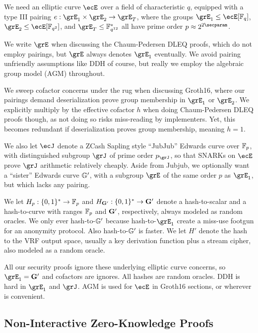 We need an elliptic curve $\ecE$ over a field of characteristic $q$,
equipped with a type III pairing $e : \grE_1 \times \grE_2 \to \grE_T$,
where the groups  $\grE_1 \le \ecE[\F_q]$, $\grE_2 \le \ecE[\F_{q^2}]$, and
$\grE_T \le \F^*_{q^{12}}$ all have prime order $p \approx 2^{2\secparam}$.

We write $\grE$ when discussing the Chaum-Pedersen DLEQ proofs, which do
not employ pairings, but $\grE$ always denotes $\grE_1$ eventually.
We avoid pairing unfriendly assumptions like DDH of course, but really
we employ the algebraic group model (AGM) throughout.

We sweep cofactor concerns under the rug when discussing Groth16,
where our pairings demand deserialization prove group membership in $\grE_1$
or $\grE_2$.  We explicitly multiply by the effective cofactor $h$ when
doing Chaum-Pedersen DLEQ proofs though, as not doing so risks miss-reading
by implementers.  Yet, this becomes redundant if deserialization proves
group membership, meaning $h=1$.

We also let $\ecJ$ denote a ZCash Sapling style ``JubJub'' Edwards curve
over $\mathbb{F}_p$, with distinguished subgroup $\grJ$ of prime order $p_\grJ$, so that
SNARKs on $\ecE$ prove $\grJ$ arithmetic relatively cheaply.
Aside from Jubjub, we optionally want a ``sister'' Edwards curve ${\mathbb{G}'}$,
with a subgroup $\grE$ of the same order $p$ as $\grE_1$,
 but which lacks any pairing.

We let $H_p : \{0,1\}^* \to \mathbb{F}_p$ and $H_{{\mathbf{G}'}} : \{0,1\}^* \to {\mathbf{G}'}$
denote a hash-to-scalar and a hash-to-curve  with ranges
$\mathbb{F}_p$ and ${\mathbf{G}'}$, respectively, always modeled as random oracles.  
We only ever hash-to-${\mathbb{G}'}$ because hash-to-$\grE_1$ create a miss-use
footgun for an anonymity protocol.  Also hash-to-${\mathbb{G}'}$ is faster.
We let $H'$ denote the hash to the VRF output space, usually
 a key derivation function plus a stream cipher, also modeled as a random oracle.

All our security proofs ignore these underlying elliptic curve concerns,
so $\grE_1 = \grEsis$ and cofactors are ignores.
All hashes are random oracles.  DDH is hard in $\grE_1$ and $\grJ$.
AGM is used for $\ecE$ in Groth16 sections, or wherever is convenient. 




\subsection{Non-Interactive Zero-Knowledge Proofs}
\label{subsec:zkp_background}

